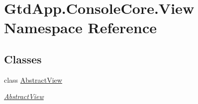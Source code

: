 \hypertarget{namespace_gtd_app_1_1_console_core_1_1_view}{}\section{Gtd\+App.\+Console\+Core.\+View Namespace Reference}
\label{namespace_gtd_app_1_1_console_core_1_1_view}
\subsection*{Classes}
\begin{DoxyCompactItemize}
\item 
class \mbox{\hyperlink{class_gtd_app_1_1_console_core_1_1_view_1_1_abstract_view}{Abstract\+View}}
\begin{DoxyCompactList}\small\item\em \mbox{\hyperlink{class_gtd_app_1_1_console_core_1_1_view_1_1_abstract_view}{Abstract\+View}} \end{DoxyCompactList}\end{DoxyCompactItemize}
